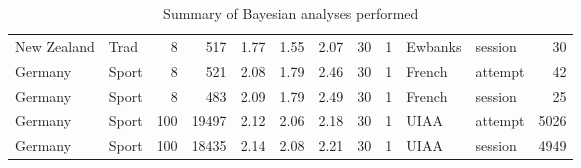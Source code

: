 \begin{table}[ht]
\begin{tabular}{llrrrrrrrllr}
  New Zealand & Trad &   8 & 517 & 1.77 & 1.55 & 2.07 &  30 &   1 & Ewbanks & session &  30 \\ 
  Germany & Sport &   8 & 521 & 2.08 & 1.79 & 2.46 &  30 &   1 & French & attempt &  42 \\ 
  Germany & Sport &   8 & 483 & 2.09 & 1.79 & 2.49 &  30 &   1 & French & session &  25 \\ 
  Germany & Sport & 100 & 19497 & 2.12 & 2.06 & 2.18 &  30 &   1 & UIAA & attempt & 5026 \\ 
  Germany & Sport & 100 & 18435 & 2.14 & 2.08 & 2.21 &  30 &   1 & UIAA & session & 4949 \\ 
   \hline
\end{tabular}
\caption{Summary of Bayesian analyses performed} 
\label{datatable}
\end{table}

